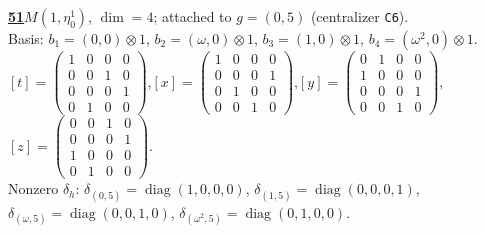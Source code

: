 \begin{samepage}\noindent\textbf{\underline{51}}\quad $M(1,\eta^{1}_{0})$, $\dim=4$; attached to $g=(0,5)$ (centralizer \texttt{C6}).\\
Basis: $b_{1}=(0,0)\otimes 1$, $b_{2}=(\omega,0)\otimes 1$, $b_{3}=(1,0)\otimes 1$, $b_{4}=(\omega^2,0)\otimes 1$.\\
$[t]=\left(\begin{smallmatrix} 1 & 0 & 0 & 0 \\ 0 & 0 & 1 & 0 \\ 0 & 0 & 0 & 1 \\ 0 & 1 & 0 & 0 \end{smallmatrix}\right)$,\quad $[x]=\left(\begin{smallmatrix} 1 & 0 & 0 & 0 \\ 0 & 0 & 0 & 1 \\ 0 & 1 & 0 & 0 \\ 0 & 0 & 1 & 0 \end{smallmatrix}\right)$,\quad $[y]=\left(\begin{smallmatrix} 0 & 1 & 0 & 0 \\ 1 & 0 & 0 & 0 \\ 0 & 0 & 0 & 1 \\ 0 & 0 & 1 & 0 \end{smallmatrix}\right)$,\quad $[z]=\left(\begin{smallmatrix} 0 & 0 & 1 & 0 \\ 0 & 0 & 0 & 1 \\ 1 & 0 & 0 & 0 \\ 0 & 1 & 0 & 0 \end{smallmatrix}\right)$.\\
Nonzero $\delta_h$: $\delta_{(0,5)}=\operatorname{diag}(1,0,0,0)$, $\delta_{(1,5)}=\operatorname{diag}(0,0,0,1)$, $\delta_{(\omega,5)}=\operatorname{diag}(0,0,1,0)$, $\delta_{(\omega^2,5)}=\operatorname{diag}(0,1,0,0)$.\end{samepage}
\medskip

